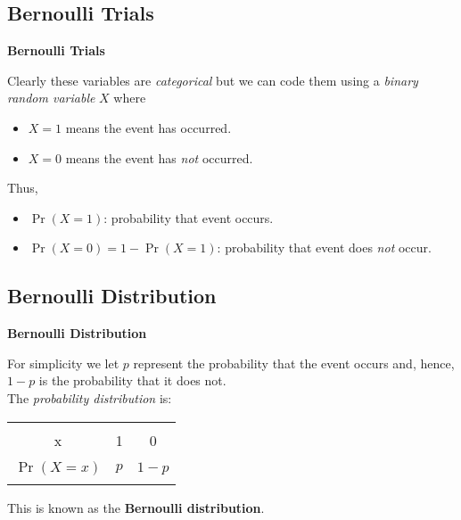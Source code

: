 \documentclass[compress]{beamer}        %
\makeatletter
\newcommand{\tcb}{\textcolor{beamer@blendedblue}}
\makeatother
\begin{document}
\subsection{Bernoulli Trials}
\begin{frame}{\bf \tcb{Bernoulli Trials}}

Clearly these variables are \emph{categorical} but we can code them using a \emph{binary random variable} $X$ where\\[0.1cm]
\begin{itemize}\itemsep0.3cm
\item $X = 1$ means the event has occurred.
\item $X = 0$ means the event has \emph{not} occurred.\\[0.6cm]
\end{itemize}

Thus,\\[0.1cm]
\begin{itemize}\itemsep0.3cm
\item $\Pr(X=1)$: probability that event occurs.
\item $\Pr(X=0) = 1 - \Pr(X=1)$: probability that event does \emph{not} occur.\\[0.4cm]
\end{itemize}


\end{frame}






\subsection{Bernoulli Distribution}
\begin{frame}{\bf \tcb{Bernoulli Distribution}}

For simplicity we let $p$ represent the probability that the event occurs and, hence, $1-p$ is the probability that it does not.\\[0.8cm]

The \emph{probability distribution} is:\\[0.1cm]
\begin{center}
\begin{tabular}{|c|cc|}
\hline
&&\\[-0.4cm]
x & 1 & 0 \\
\hline
&&\\[-0.4cm]
$\Pr(X=x)$ & $p$ & $1-p$ \\[0.1cm]
\hline
\multicolumn{3}{c}{}\\
\end{tabular}
\end{center}
This is known as the {\bf Bernoulli distribution}.

\end{frame}
\end{document}
